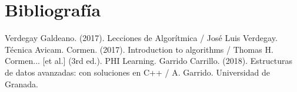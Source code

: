\documentclass[13pt]{beamer}
\begin{document}

    \section{Bibliografía}

    \begin{frame}
        \begin{thebibliography}{0}
             Verdegay Galdeano. (2017). Lecciones de Algorítmica / José Luis Verdegay. Técnica Avicam.
             Cormen. (2017). Introduction to algorithms / Thomas H. Cormen... [et al.] (3rd ed.). PHI Learning.
             Garrido Carrillo. (2018). Estructuras de datos avanzadas: con soluciones en C++ / A. Garrido. Universidad de Granada.  
        \end{thebibliography}
    \end{frame}
\end{document}
